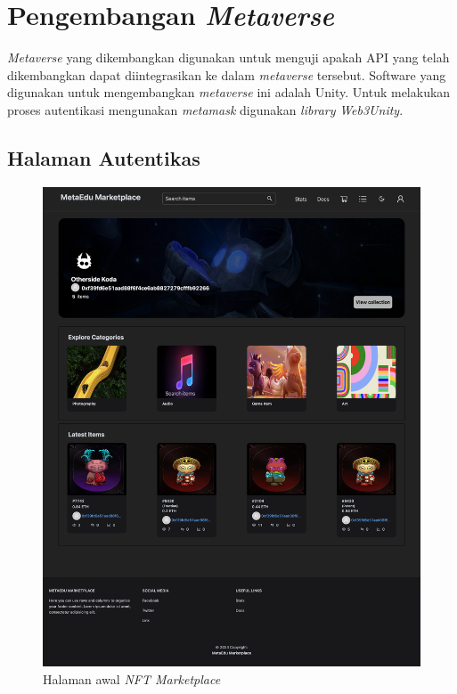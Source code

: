 \section{Pengembangan \emph{Metaverse}} 

\emph{Metaverse} yang dikembangkan digunakan untuk menguji apakah API yang telah dikembangkan dapat diintegrasikan ke dalam \emph{metaverse} tersebut. Software yang digunakan untuk mengembangkan \emph{metaverse} ini adalah Unity. Untuk melakukan proses autentikasi mengunakan \emph{metamask} digunakan \emph{library} \emph{Web3Unity}. 

\subsection{Halaman Autentikas} 

\begin{figure} [H] \centering
  \includegraphics[scale=0.12]{gambar/img-frontend-index.png}
  \caption{Halaman awal \emph{NFT Marketplace}}
  \label{fig:NFTMarketplace}
\end{figure}

